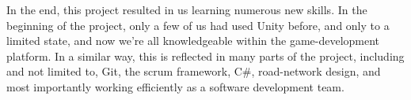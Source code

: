         In the end, this project resulted in us learning numerous new skills. In the beginning of the project, only a few of us had used Unity before, and only to a limited state, and now we're all knowledgeable within the game-development platform. In a similar way, this is reflected in many parts of the project, including and not limited to, Git, the scrum framework, C\#, road-network design, and most importantly working efficiently as a software development team. 
